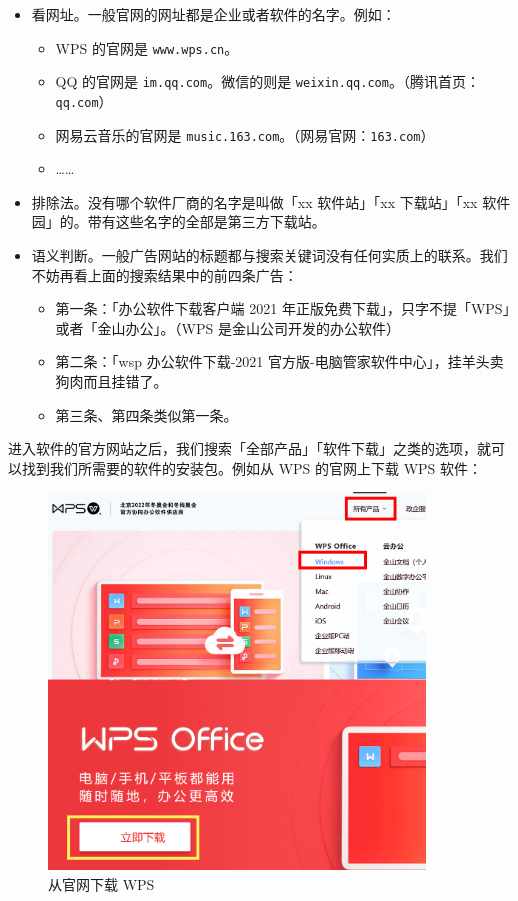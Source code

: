 \begin{itemize}
  \item 看网址。一般官网的网址都是企业或者软件的名字。例如：
  \begin{itemize}
    \item WPS 的官网是 \verb|www.wps.cn|。
    \item QQ 的官网是 \verb|im.qq.com|。微信的则是 \verb|weixin.qq.com|。（腾讯首页：\verb|qq.com|）
    \item 网易云音乐的官网是 \verb|music.163.com|。（网易官网：\verb|163.com|）
    \item ……
  \end{itemize}
  \item 排除法。没有哪个软件厂商的名字是叫做「xx 软件站」「xx 下载站」「xx 软件园」的。带有这些名字的全部是第三方下载站。
  \item 语义判断。一般广告网站的标题都与搜索关键词没有任何实质上的联系。我们不妨再看上面的搜索结果中的前四条广告：
  \begin{itemize}
    \item 第一条：「办公软件下载客户端 2021 年正版免费下载」，只字不提「WPS」或者「金山办公」。（WPS 是金山公司开发的办公软件）
    \item 第二条：「wsp 办公软件下载-2021 官方版-电脑管家软件中心」，挂羊头卖狗肉而且挂错了。
    \item 第三条、第四条类似第一条。
  \end{itemize}
\end{itemize}

进入软件的官方网站之后，我们搜索「全部产品」「软件下载」之类的选项，就可以找到我们所需要的软件的安装包。例如从 WPS 的官网上下载 WPS 软件：

\begin{figure}[htb!]
  \centering
  \includegraphics[width=10cm]{assets/Download_WPS.png}
  \caption{从官网下载 WPS}
  \label{download-wps}
\end{figure}

